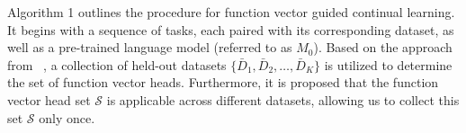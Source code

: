 Algorithm 1 outlines the procedure for function vector guided continual learning. It begins with a sequence of tasks, each paired with its corresponding dataset, as well as a pre-trained language model (referred to as \( M_0 \)). Based on the approach from ~\cite{todd2023function}, a collection of held-out datasets \( \{\bar{D}_1, \bar{D}_2, \ldots, \bar{D}_K\} \) is utilized to determine the set of function vector heads. Furthermore, it is proposed that the function vector head set \( \mathcal{S} \) is applicable across different datasets, allowing us to collect this set \( \mathcal{S} \) only once.

  



  
